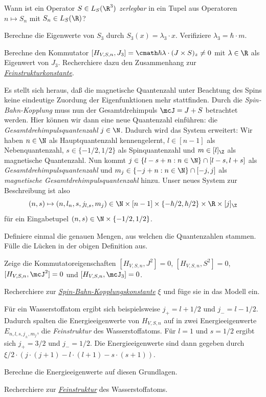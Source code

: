 \documentclass{subfiles}
\begin{document}
    \begin{Aufgabe}
        \nr{} Wann ist ein Operator $S\in L_S(\R^3)$ \emph{zerlegbar} in ein Tupel aus Operatoren $n\mapsto S_n$ mit $S_n\in L_S(\R)$?

        \nr{} Berechne die Eigenwerte von $S_3$ durch $S_3(x) = \lambda_3\cdot x$. Verifiziere $\lambda_3 = \hbar\cdot m$. 

        \nr{} Berechne den Kommutator $[H_{V,S,n},J_3] = \cmath\hbar\lambda\cdot (J\times S)_z\neq 0$ mit $\lambda\in\R$ als Eigenwert von $J_3$. Recherchiere dazu den Zusammenhang zur \href{https://en.wikipedia.org/wiki/Fine-structure_constant}{\emph{Feinstrukturkonstante}}.
    \end{Aufgabe}
    Es stellt sich heraus, daß die magnetische Quantenzahl unter Beachtung des Spins keine eindeutige Zuordung der Eigenfunktionen mehr stattfinden. Durch die \emph{Spin-Bahn-Kopplung} muss nun der Gesamtdrehimpuls $\mcJ = J + S$ betrachtet werden. Hier können wir dann eine neue Quantenzahl einführen: die \emph{Gesamtdrehimpulsquantenzahl} $j\in\N$. Dadurch wird das System erweitert: Wir haben $n\in\N$ als Hauptquantenzahl kennengelernt, $l \in [n - 1]$ als Nebenquantenzahl, $s\in\{-1/2,1/2\}$ als Spinquantenzahl und $m\in [l]_\Z$ als magnetische Quantenzahl. Nun kommt $j\in \{l-s + n:n\in\N\}\cap[l-s,l+s]$ als \emph{Gesamtdrehimpulsquantenzahl} und $m_j\in \{-j + n:n\in\N\}\cap[-j,j]$ als \emph{magnetische Gesamtdrehimpulsquantenzahl} hinzu. Unser neues System zur Beschreibung ist also
    \[
        (n,s)\mapsto (n,l_n,s,j_{l,s},m_j) \in\N\times [n-1]\times\{-\hbar/2,\hbar/2\}\times\R\times [j]_\Z
    \]
    für ein Eingabetupel $(n,s)\in\N\times\{-1/2,1/2\}$.
    \begin{Aufgabe}
        \nr{} Definiere einmal die genauen Mengen, aus welchen die Quantenzahlen stammen. Fülle die Lücken in der obigen Definition aus.

        \nr{} Zeige die Kommutatoreigenschaften $[H_{V,S,n},J^2] = 0$, $[H_{V,S,n},S^2] = 0$, $[H_{V,S,n},\mcJ^2] = 0$ und $[H_{V,S,n},\mcJ_3] = 0$.  

        \nr{} Recherchiere zur \href{https://de.wikipedia.org/wiki/Spin-Bahn-Kopplung}{\emph{Spin-Bahn-Kopplungskonstante}} $\xi$ und füge sie in das Modell ein.
    \end{Aufgabe}
    Für ein Wasserstoffatom ergibt sich beispielsweise $j_+ = l + 1/2$ und $j_- = l - 1/2$. Dadurch spalten die Energieeigenwerte von $H_{V,S,n}$ auf in zwei Energieeigenwerte $E_{n,l,s,j_\pm,m_j}$, die \emph{Feinstruktur} des Wasserstoffatoms. Für $l = 1$ und $s = 1/2$ ergibt sich $j_+ = 3/2$ und $j_- = 1/2$. Die Energieeigenwerte sind dann gegeben durch $\xi/2\cdot (j\cdot(j+1) - l\cdot(l + 1) - s\cdot (s + 1))$. 
    \begin{Aufgabe}
        \nr{} Berechne die Energieeigenwerte auf diesen Grundlagen.

        \nr{} Recherchiere zur \href{https://de.wikipedia.org/wiki/Feinstruktur_(Physik)}{\emph{Feinstruktur}} des Wasserstoffatoms.
    \end{Aufgabe}
\end{document}
